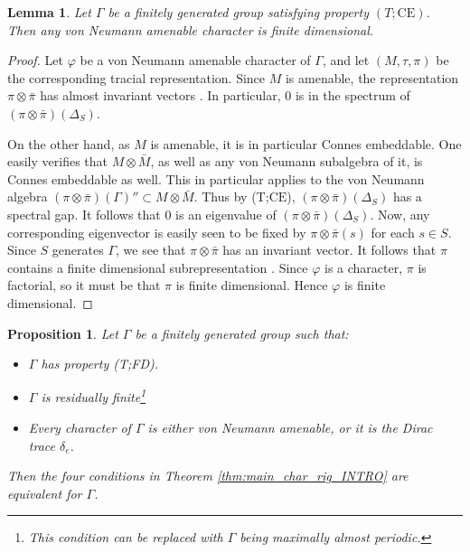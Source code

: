\documentclass[11pt]{amsart}
\newtheorem{lemma}[theorem]{Lemma}
\newtheorem{proposition}[theorem]{Proposition}
\theoremstyle{definition}
\theoremstyle{remark}
\theoremstyle{definition}
\begin{document}
\begin{lemma}\label{lem:T CE implies rigidity}
  Let  $\Gamma$ be a finitely generated group satisfying property  $(T;\mathrm{CE})$. Then any von Neumann amenable character is finite dimensional.
\end{lemma}

\begin{proof}
    Let $\varphi$ be a von Neumann amenable character of $\Gamma$, and let $(M,\tau,\pi)$ be the corresponding tracial representation. Since $M$ is amenable, the representation $\pi\otimes \bar{\pi}$ has almost invariant vectors \cite[Theorem 10.2.9]{Popa}.
    In particular,  $0$ is in the spectrum of $(\pi\otimes\bar\pi)(\Delta_S)$. 

    On the other hand, as $M$ is amenable, it is in particular Connes embeddable. One easily verifies that $M\otimes \bar{M}$, as well as any von Neumann subalgebra of it, is Connes embeddable as well. This in particular applies to the von Neumann algebra $(\pi\otimes\bar{\pi})(\Gamma)''\subset M\otimes \bar{M}$. Thus by (T;$\mathrm{CE}$), $(\pi\otimes \bar{\pi})(\Delta_S)$ has a spectral gap. It follows that $0$ is an eigenvalue of  $(\pi\otimes \bar{\pi})(\Delta_S)$. Now, any corresponding eigenvector is easily seen to be fixed by $\pi\otimes\bar{\pi}(s)$ for each $s\in S$. Since $S$ generates $\Gamma$, we see that $\pi\otimes\bar{\pi}$ has an invariant vector. It follows that $\pi$ contains a finite dimensional subrepresentation \cite[Proposition A.1.12]{Bekka}.  Since $\varphi$ is a character, $\pi$ is factorial, so it must be that $\pi$ is finite dimensional. Hence $\varphi$ is finite dimensional. 
\end{proof}

\begin{proposition}\label{prop:criterion-for-main-thm}
    Let $\Gamma$ be a finitely generated group such that:
    \begin{itemize}
        \item $\Gamma$ has property (T;FD).
        \item $\Gamma$ is residually finite\footnote{This condition can be replaced with $\Gamma$ being maximally almost periodic.}
        \item Every character of $\Gamma$ is either von Neumann amenable, or it is the Dirac trace $\delta_e$. 
    \end{itemize}
   Then the four conditions in Theorem \ref{thm:main_char_rig_INTRO} are equivalent for $\Gamma$.
\end{proposition}
    
\end{document}
